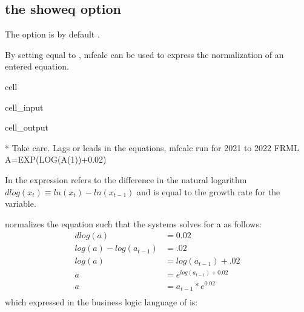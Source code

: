\documentclass[letterpaper,10pt,english]{jupyterBook}
\begin{document}
\subsection{ \sphinxhyphen{} the showeq option}
\label{\detokenize{content/04_PythonEssentials/mfcalc:mfcalc-the-showeq-option}}
\sphinxAtStartPar
The  option is by default .

\sphinxAtStartPar
By setting equal to , mfcalc can be used to express the normalization of an entered equation.

\begin{sphinxuseclass}{cell}\begin{sphinxVerbatimInput}

\begin{sphinxuseclass}{cell_input}
\begin{sphinxVerbatim}[commandchars=\\\{\}]
\end{sphinxVerbatim}

\end{sphinxuseclass}\end{sphinxVerbatimInput}
\begin{sphinxVerbatimOutput}

\begin{sphinxuseclass}{cell_output}
\begin{sphinxVerbatim}[commandchars=\\\{\}]
* Take care. Lags or leads in the equations, mfcalc run for 2021 to 2022
FRML \PYGZlt{}\PYGZgt{} A=EXP(LOG(A(\PYGZhy{}1))+0.02)\PYGZdl{}
\end{sphinxVerbatim}

\end{sphinxuseclass}\end{sphinxVerbatimOutput}

\end{sphinxuseclass}
\sphinxAtStartPar
In  the expression  refers to the difference in the natural logarithm \(dlog(x_t) \equiv ln(x_t)-ln(x_{t-1})\) and is equal to the growth rate for the variable.

\sphinxAtStartPar
{} normalizes the equation such that the systems solves for a as follows:
\begin{align*}
dlog(a) &= 0.02\\
log(a)-log(a_{t-1}) &= .02\\
log(a) &=log(a_{t-1})+.02\\
a &= e^{log(a_{t-1})+0.02}\\
a &=a_{t-1}*e^{0.02}\\
\end{align*}
\sphinxAtStartPar
which expressed in the business logic language of  is:
\end{document}
